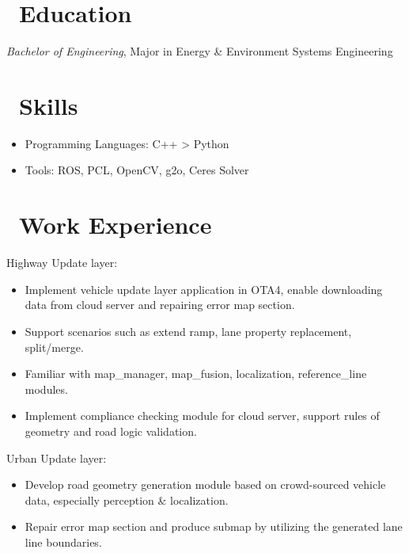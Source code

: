\documentclass{resume}
\begin{document}



\section{\faGraduationCap\ Education}
\textit{Bachelor of Engineering}, Major in Energy \& Environment Systems Engineering

\section{\faCogs\ Skills}
\begin{itemize}[parsep=0.5ex]
  \item Programming Languages: C++ > Python
  \item Tools: ROS, PCL, OpenCV, g2o, Ceres Solver
\end{itemize}

\section{\faUsers\ Work Experience}
Highway Update layer:
\begin{itemize}
  \item Implement vehicle update layer application in OTA4, enable downloading data from cloud server and repairing error map section.
  \item Support scenarios such as extend ramp, lane property replacement, split/merge.
  \item Familiar with map\_manager, map\_fusion, localization, reference\_line modules.
  \item Implement compliance checking module for cloud server, support rules of geometry and road logic validation.
\end{itemize}

Urban Update layer:
\begin{itemize}
  \item Develop road geometry generation module based on crowd-sourced vehicle data, especially perception \& localization.
  \item Repair error map section and produce submap by utilizing the generated lane line boundaries.
\end{itemize}
\end{document}
